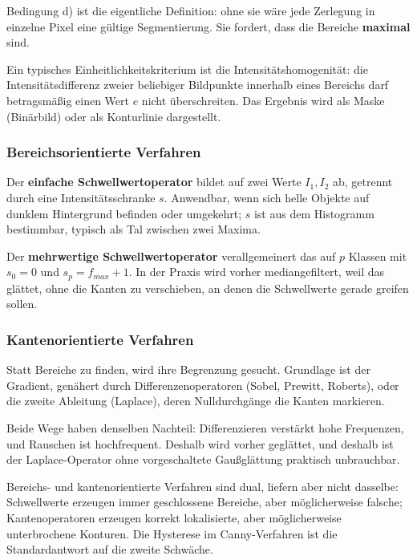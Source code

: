 \documentclass[12pt, a4paper]{article}
\begin{document}
Bedingung d) ist die eigentliche Definition: ohne sie wäre jede Zerlegung in einzelne
Pixel eine gültige Segmentierung. Sie fordert, dass die Bereiche \textbf{maximal} sind.

Ein typisches Einheitlichkeitskriterium ist die Intensitätshomogenität: die
Intensitätsdifferenz zweier beliebiger Bildpunkte innerhalb eines Bereichs darf
betragsmäßig einen Wert $e$ nicht überschreiten. Das Ergebnis wird als Maske
(Binärbild) oder als Konturlinie dargestellt.

\subsubsection*{Bereichsorientierte Verfahren}

Der \textbf{einfache Schwellwertoperator} bildet auf zwei Werte $I_1, I_2$ ab, getrennt
durch eine Intensitätsschranke $s$. Anwendbar, wenn sich helle Objekte auf dunklem
Hintergrund befinden oder umgekehrt; $s$ ist aus dem Histogramm bestimmbar, typisch als
Tal zwischen zwei Maxima.

Der \textbf{mehrwertige Schwellwertoperator} verallgemeinert das auf $p$ Klassen mit
$s_0 = 0$ und $s_p = f_{max} + 1$. In der Praxis wird vorher mediangefiltert, weil das
glättet, ohne die Kanten zu verschieben, an denen die Schwellwerte gerade greifen
sollen.

\subsubsection*{Kantenorientierte Verfahren}

Statt Bereiche zu finden, wird ihre Begrenzung gesucht. Grundlage ist der Gradient,
genähert durch Differenzenoperatoren (Sobel, Prewitt, Roberts), oder die zweite
Ableitung (Laplace), deren Nulldurchgänge die Kanten markieren.

Beide Wege haben denselben Nachteil: Differenzieren verstärkt hohe Frequenzen, und
Rauschen ist hochfrequent. Deshalb wird vorher geglättet, und deshalb ist der
Laplace-Operator ohne vorgeschaltete Gaußglättung praktisch unbrauchbar.

\begin{notebox}
Bereichs- und kantenorientierte Verfahren sind dual, liefern aber nicht dasselbe:
Schwellwerte erzeugen immer geschlossene Bereiche, aber möglicherweise falsche;
Kantenoperatoren erzeugen korrekt lokalisierte, aber möglicherweise unterbrochene
Konturen. Die Hysterese im Canny-Verfahren ist die Standardantwort auf die zweite
Schwäche.
\end{notebox}
\end{document}
